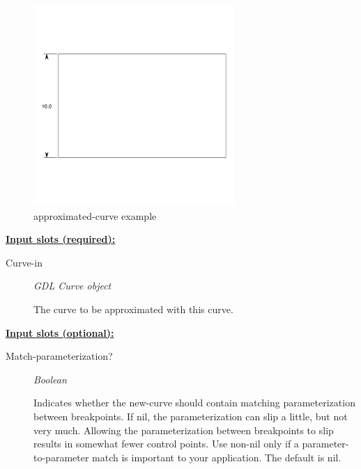 \documentclass [11pt]{book}
\begin{document}
\begin{itemize}
\begin{figure}
\begin{center}
\includegraphics[width=3in,height=3in]{../images/example-approximated-curve.pdf}
\end{center}

\caption{approximated-curve example}

\label{fig:approximated-curve}

\end{figure}





\textbf{
\underline{Input slots (required):}}

\begin{description}

\item [Curve-in]
\emph{GDL Curve object}

 The curve to be approximated with this curve.




\end{description}






\textbf{
\underline{Input slots (optional):}}

\begin{description}

\item [Match-parameterization?]
\emph{Boolean}

 Indicates whether the new-curve should contain matching parameterization between breakpoints. If nil, the
parameterization can slip a little, but not very much. Allowing the parameterization between breakpoints to slip
results in somewhat fewer control points. Use non-nil only if a parameter-to-parameter match is important to your application.
The default is nil.





\end{description}
\end{itemize}
\end{document}
